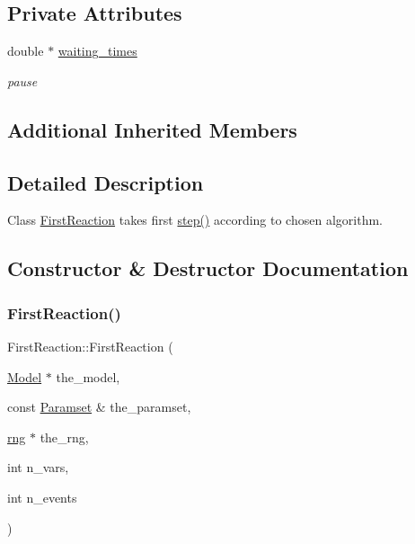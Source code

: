 \subsection*{Private Attributes}
\begin{DoxyCompactItemize}
\item 
\mbox{\label{class_first_reaction_adef190a1cb589cc8317b469f94cd6ad4}} 
double $\ast$ \hyperlink{class_first_reaction_adef190a1cb589cc8317b469f94cd6ad4}{waiting\+\_\+times}
\begin{DoxyCompactList}\small\item\em pause \end{DoxyCompactList}\end{DoxyCompactItemize}
\subsection*{Additional Inherited Members}


\subsection{Detailed Description}
Class \hyperlink{class_first_reaction}{First\+Reaction} takes first \hyperlink{class_first_reaction_aed63c3c95d20b2ad557dabb6c5376a73}{step()} according to chosen algorithm. 

\subsection{Constructor \& Destructor Documentation}
\mbox{\label{class_first_reaction_a5122d48f6ecbe17a75cecd41b06ac4a2}} 
\subsubsection{\texorpdfstring{First\+Reaction()}{FirstReaction()}}
{\footnotesize\ttfamily First\+Reaction\+::\+First\+Reaction (\begin{DoxyParamCaption}\item[{\hyperlink{class_model}{Model} $\ast$}]{the\+\_\+model,  }\item[{const \hyperlink{class_paramset}{Paramset} \&}]{the\+\_\+paramset,  }\item[{\hyperlink{classrng}{rng} $\ast$}]{the\+\_\+rng,  }\item[{int}]{n\+\_\+vars,  }\item[{int}]{n\+\_\+events }\end{DoxyParamCaption})}



